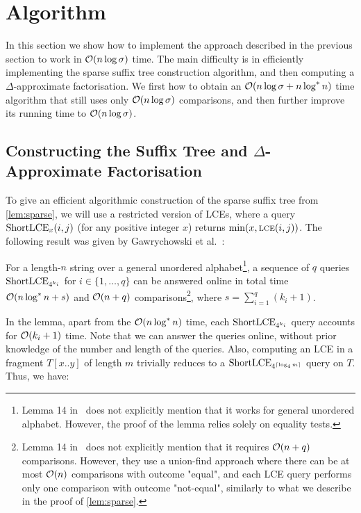 \section{Algorithm}
\label{square:sec:alg}

In this section we show how to implement the approach described in the previous section
to work in $\mathcal{O}(n\log \sigma)$ time. The main
difficulty is in efficiently implementing the sparse suffix tree construction algorithm, and
then computing a $\Delta$-approximate factorisation. We first how to obtain an $\mathcal{O}(n\log \sigma+n\log^{*}n)$ time
algorithm that still uses only $\mathcal{O}(n\log \sigma)$ comparisons, and then further improve its running time to $\mathcal{O}(n\log \sigma)$.

\subsection[Constructing the Suffix Tree and Factorisation]{Constructing the Suffix Tree and \boldmath$\Delta$\unboldmath-Approximate Factorisation}
\label{sec:suffixtree}

To give an efficient algorithmic construction of the sparse suffix tree from \cref{lem:sparse}, we will use a restricted version of LCEs, where a query $\textnormal{ShortLCE}_x(i, j)$ (for any positive integer $x$) returns $\min(x, \textnormal{\textsc{lce}}(i, j))$. The following result was given by Gawrychowski et al.~\cite{Gawrychowski2016}:

\begin{lemma}
\label{lem:LCE_undordered_original}
For a length-$n$ string over a general unordered alphabet\footnote{Lemma 14 in~\cite{Gawrychowski2016} does not explicitly mention that it works for general unordered alphabet. However, the proof of the lemma relies solely on equality tests.}, a sequence of $q$ queries $\textnormal{ShortLCE}_{4^{k_i}}$ for $i \in \{1, \dots, q\}$ can be answered online in total time $\mathcal{O}(n \log^* n + s)$ and $\mathcal{O}(n + q)$ comparisons\footnote{Lemma 14 in~\cite{Gawrychowski2016} does not explicitly mention that it requires $\mathcal{O}(n + q)$ comparisons. However, they use a union-find approach where there can be at most $\mathcal{O}(n)$ comparisons with outcome "equal", and each LCE query performs only one comparison with outcome "not-equal", similarly to what we describe in the proof of \cref{lem:sparse}.}, where $s = \sum_{i = 1}^q(k_i + 1)$.
\end{lemma}

In the lemma, apart from the $\mathcal{O}(n \log^* n)$ time, each $\textnormal{ShortLCE}_{4^{k_i}}$ query accounts for $\mathcal{O}(k_i + 1)$ time. Note that we can answer the queries online, without prior knowledge of the number and length of the queries. Also, computing an LCE in a fragment $T[x..y]$ of length $m$ trivially reduces to a $\textnormal{ShortLCE}_{4^{\left\lceil\log_4 m\right\rceil}}$ query on $T$. Thus, we have:

